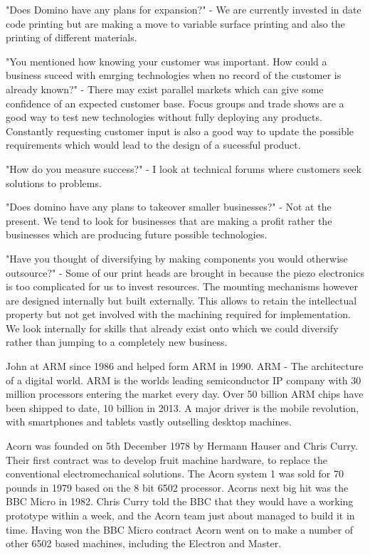 \documentclass{elec6049Report}     %
\begin{document}
"Does Domino have any plans for expansion?" - 
We are currently invested in date code printing but are making a move to variable surface printing and also the printing of different materials.

"You mentioned how knowing your customer was important. How could a business suceed with emrging technologies when no record of the customer is already known?" -
There may exist parallel markets which can give some confidence of an expected customer base.
Focus groups and trade shows are a good way to test new technologies without fully deploying any products.
Constantly requesting customer input is also a good way to update the possible requirements which would lead to the design of a sucessful product.

"How do you measure success?" -
I look at technical forums where customers seek solutions to problems.

"Does domino have any plans to takeover smaller businesses?" -
Not at the present.
We tend to look for businesses that are making a profit rather the businesses which are producing future possible technologies.

"Have you thought of diversifying by making components you would otherwise outsource?" - 
Some of our print heads are brought in because the piezo electronics is too complicated for us to invest resources.
The mounting mechanisms however are designed internally but built externally. 
This allows to retain the intellectual property but not get involved with the machining required for implementation.
We look internally for skills that already exist onto which we could diversify rather than jumping to a completely new business. 

John at ARM since 1986 and helped form ARM in 1990. 
ARM - The architecture of a digital world.
ARM is the worlds leading semiconductor IP company with 30 million processors entering the market every day.
Over 50 billion ARM chips have been shipped to date, 10 billion in 2013. A major driver is the mobile revolution, with smartphones and tablets vastly outselling desktop machines.

Acorn was founded on 5th December 1978 by Hermann Hauser and Chris Curry. Their first contract was to develop fruit machine hardware, to replace the conventional electromechanical solutions. The Acorn system 1 was sold for 70 pounds in 1979 based on the 8 bit 6502 processor. Acorns next big hit was the BBC Micro in 1982. Chris Curry told the BBC that they would have a working prototype within a week, and the Acorn team just about managed to build it in time. Having won the BBC Micro contract Acorn went on to make a number of other 6502 based machines, including the Electron and Master.
\end{document}
